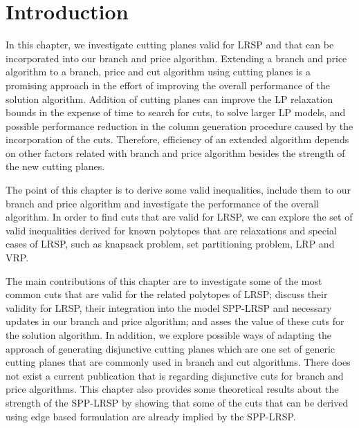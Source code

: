 
\section{Introduction}
In this chapter, we investigate cutting planes valid for LRSP and
that can be incorporated into our branch and price algorithm. Extending
a branch and price algorithm to a branch, price and cut algorithm
using cutting planes is a promising approach in the effort of
improving the overall performance of the solution algorithm. Addition of
cutting planes can improve the LP relaxation bounds in the expense
of time to search for cuts, to solve larger LP models, and possible
performance reduction in the column generation procedure caused by
the incorporation of the cuts. Therefore, efficiency of an extended
algorithm depends on other factors related with branch and price
algorithm besides the strength of the new cutting planes.

The point of this chapter is to derive some valid inequalities,
include them to our branch and price algorithm and investigate the
performance of the overall algorithm. In order to find cuts that are
valid for LRSP, we can explore the set of valid inequalities derived
for known polytopes that are relaxations and special cases of LRSP,
such as knapsack problem, set partitioning problem, LRP and VRP.


The main contributions of this chapter are to investigate some of
the most common cuts that are valid for the related polytopes of
LRSP; discuss their validity for LRSP, their integration
into the model SPP-LRSP and necessary updates in our branch and
price algorithm; and asses the value of these cuts for the solution
algorithm. In addition, we explore possible ways of adapting the approach of
generating disjunctive cutting planes which are one set of generic
cutting planes that are commonly used in branch and cut algorithms.
There does not exist a current publication that is regarding disjunctive
cuts for branch and price algorithms. This chapter also provides some
theoretical results about the strength of the SPP-LRSP by showing that
some of the cuts that can be derived using edge based formulation are
already implied by the SPP-LRSP.


